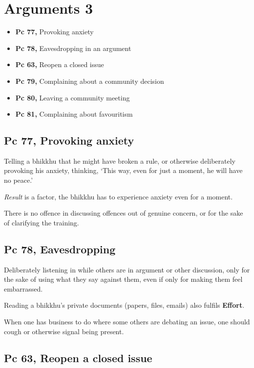 \chapter{Arguments 3}

\begin{itemize}
\tightlist
\item
  \textbf{Pc 77,} Provoking anxiety
\item
  \textbf{Pc 78,} Eavesdropping in an argument
\item
  \textbf{Pc 63,} Reopen a closed issue
\item
  \textbf{Pc 79,} Complaining about a community decision
\item
  \textbf{Pc 80,} Leaving a community meeting
\item
  \textbf{Pc 81,} Complaining about favouritism
\end{itemize}

\section{Pc 77, Provoking anxiety}

Telling a bhikkhu that he might have broken a rule, or otherwise
deliberately provoking his anxiety, thinking, `This way, even for just a
moment, he will have no peace.'

\emph{Result} is a factor, the bhikkhu has to experience anxiety even
for a moment.

There is no offence in discussing offences out of genuine concern, or
for the sake of clarifying the training.

\section{Pc 78, Eavesdropping}

Deliberately listening in while others are in argument or other
discussion, only for the sake of using what they say against them, even
if only for making them feel embarrassed.

Reading a bhikkhu's private documents (papers, files, emails) also
fulfils \textbf{Effort}.

When one has business to do where some others are debating an issue, one
should cough or otherwise signal being present.

\section{Pc 63, Reopen a closed issue}

